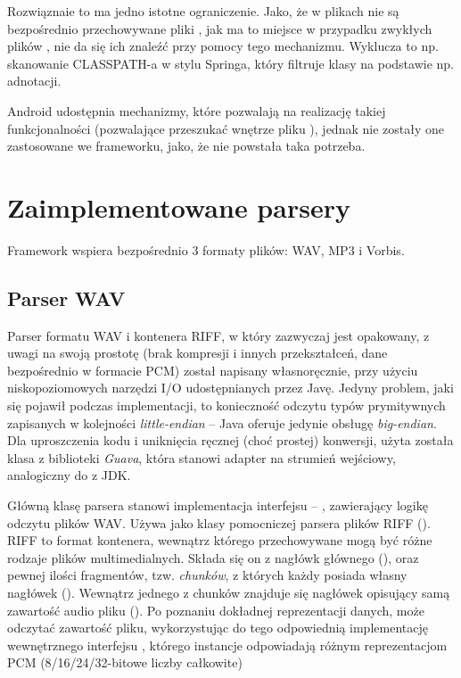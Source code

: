 Rozwiąznaie to ma jedno istotne ograniczenie. Jako, że w plikach  nie są bezpośrednio
przechowywane pliki , jak ma to miejsce w przypadku zwykłych plików , nie da
się ich znaleźć przy pomocy tego mechanizmu. Wyklucza to np. skanowanie CLASSPATH-a w stylu Springa,
który filtruje klasy na podstawie np. adnotacji. 

\begin{Note}
Android udostępnia mechanizmy, które pozwalają na realizację takiej funkcjonalności (pozwalające
przeszukać wnętrze pliku ), jednak nie zostały one zastosowane we frameworku,
jako, że nie powstała taka potrzeba.  
\end{Note}


\section{Zaimplementowane parsery}

Framework wspiera bezpośrednio 3 formaty plików: WAV, MP3 i Vorbis.

\subsection{Parser WAV}

Parser formatu WAV i kontenera RIFF, w który zazwyczaj jest opakowany, z uwagi na swoją prostotę
(brak kompresji i innych przekształceń, dane bezpośrednio w formacie PCM) został napisany
własnoręcznie, przy użyciu niskopoziomowych narzędzi I/O udostępnianych przez Javę. Jedyny problem,
jaki się pojawił podczas implementacji, to konieczność odczytu typów prymitywnych zapisanych w
kolejności \textit{little-endian} -- Java oferuje jedynie obsługę \textit{big-endian}. Dla
uproszczenia kodu i uniknięcia ręcznej (choć prostej) konwersji, użyta została klasa
 z biblioteki \emph{Guava}, która stanowi adapter na strumień
wejściowy, analogiczny do  z JDK.


Główną klasę parsera stanowi implementacja interfejsu  -- ,
zawierający logikę odczytu plików WAV. Używa jako klasy pomocniczej parsera plików RIFF
(). RIFF to format kontenera, wewnątrz którego przechowywane mogą być różne rodzaje
plików multimedialnych. Składa się on z nagłówk głównego (), oraz pewnej ilości
fragmentów, tzw. \textit{chunków}, z których każdy posiada własny nagłówek ().
Wewnątrz jednego z chunków znajduje się nagłówek opisujący samą zawartość audio pliku
(). Po poznaniu dokładnej reprezentacji danych,  może odczytać
zawartość pliku, wykorzystując do tego odpowiednią implementację wewnętrznego interfejsu
, którego instancje odpowiadają różnym reprezentacjom PCM (8/16/24/32-bitowe liczby
całkowite)

